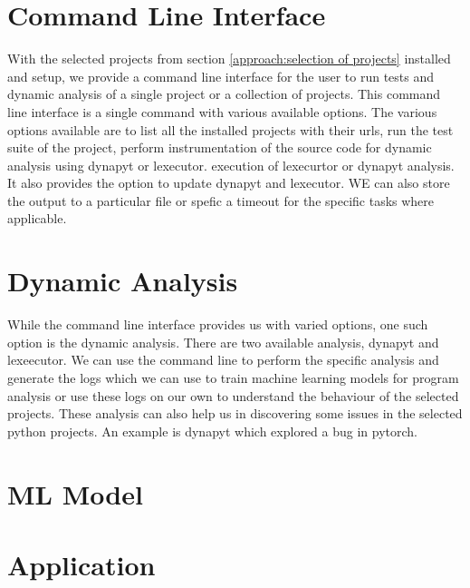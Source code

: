 \section{Command Line Interface}
\label{approach:command line interface}
With the selected projects from section \ref{approach:selection of projects} installed and setup, we provide a command line interface for the user to run tests and dynamic analysis of a single project or a collection of projects. This command line interface is a single command with various available options. The various options available are to list all the installed projects with their urls, run the test suite of the project, perform instrumentation of the source code for dynamic analysis using dynapyt or lexecutor. execution of lexecurtor or dynapyt analysis. It also provides the option to update dynapyt and lexecutor. WE can also store the output to a particular file or spefic a timeout for the specific tasks where applicable. 

\section{Dynamic Analysis}
\label{approach:dynamic analysis}
While the command line interface provides us with varied options, one such option is the dynamic analysis. There are two available analysis, dynapyt and lexeecutor. We can use the command line to perform the specific analysis and generate the logs which we can use to train machine learning models for program analysis or use these logs on our own to understand the behaviour of the selected projects. These analysis can also help us in discovering some issues in the selected python projects. An example is dynapyt which explored a bug in pytorch. 

\section{ML Model}
\label{approach:ml model}

\section{Application}
\label{approach:application}